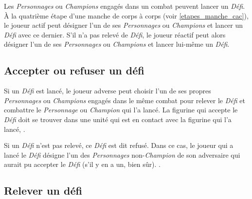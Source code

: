 Les \emph{Personnages} ou \emph{Champions} engagés dans un combat peuvent lancer un \emph{Défi}. À la quatrième étape d'une manche de corps à corps (voir \ref{etapes_manche_cac}), le joueur actif peut désigner l'un de ses \emph{Personnages} ou \emph{Champions} et lancer un \emph{Défi} avec ce dernier. S'il n'a pas relevé de \emph{Défi}, le joueur réactif peut alors désigner l'un de ses \emph{Personnages} ou \emph{Champions} et lancer lui-même un \emph{Défi}.

\subsection{Accepter ou refuser un défi}

Si un \emph{Défi} est lancé, le joueur adverse peut choisir l'un de ses propres \emph{Personnages} ou \emph{Champions} engagés dans le même combat pour relever le \emph{Défi} et combattre le \emph{Personnage} ou \emph{Champion} qui l'a lancé. La figurine qui accepte le \emph{Défi} doit se trouver dans une unité qui est en contact avec la figurine qui l'a lancé, .

Si un \emph{Défi} n'est pas relevé, ce \emph{Défi} est dit refusé. Dans ce cas, le joueur qui a lancé le \emph{Défi} désigne l'un des \emph{Personnages} non-\emph{Champion} de son adversaire qui aurait pu accepter le \emph{Défi} (s'il y en a un, bien sûr). .

\subsection{Relever un défi}

